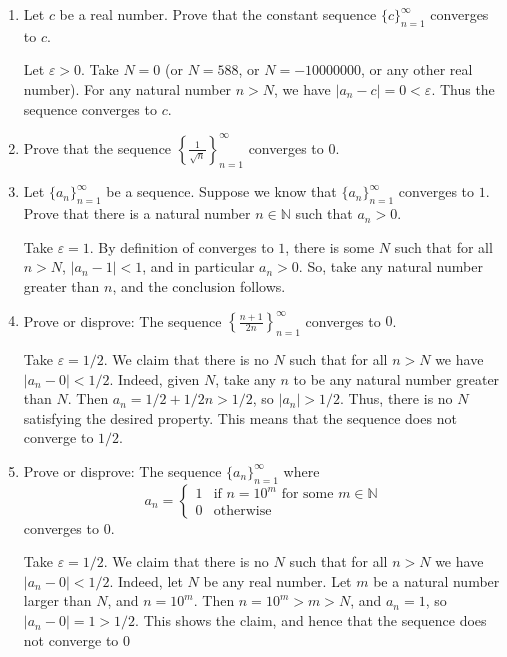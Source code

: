 \documentclass[12pt]{amsart}
\def\e{\varepsilon}
\newcommand{\N}{\mathbb{N}}
\numberwithin{equation}{section}
\theoremstyle{plain} %
\theoremstyle{definition}
\theoremstyle{remark}
\begin{document}
\begin{enumerate}
\item Let $c$ be a real number. Prove that the constant sequence $\{ c\}_{n=1}^\infty$ converges to $c$.

\begin{framed}
Let $\e>0$. Take $N=0$ (or $N=588$, or $N=-10000000$, or any other real number). For any natural number $n>N$, we have $|a_n - c| = 0 <\e$. Thus the sequence converges to $c$.
\end{framed}



\item Prove that the sequence $ \left\{ \frac{1}{\sqrt{n}} \right\}_{n=1}^\infty$ converges to $0$.





\item Let $\{a_n\}_{n=1}^\infty$ be a sequence. Suppose we know that $\{a_n\}_{n=1}^\infty$ converges to $1$. Prove that there is a natural number $n\in \N$ such that $a_n>0$.

\begin{framed}
Take $\e = 1$. By definition of converges to $1$, there is some $N$ such that for all $n>N$, $|a_n  - 1|< 1$, and in particular $a_n >0$. So, take any natural number greater than $n$, and the conclusion follows.
\end{framed}



\item Prove or disprove: The sequence $ \left\{\frac{n+1}{2n} \right\}_{n=1}^\infty$ converges to $0$.

\begin{framed}
Take $\e = 1/2$. We claim that there is no $N$ such that for all $n>N$ we have $|a_n - 0| < 1/2$. Indeed, given $N$, take any $n$ to be any natural number greater than $N$. Then $a_n = 1/2 + 1/2n > 1/2$, so $|a_n| > 1/2$. Thus, there is no $N$ satisfying the desired property. This means that the sequence does not converge to $1/2$.
\end{framed}



\item Prove or disprove: The sequence $\{a_n\}_{n=1}^\infty$ where
\[ a_n = \begin{cases} 1 &\text{if } n = 10^m \text{ for some } m\in \N \\
0 &\text{otherwise}\end{cases}
\]
converges to $0$. 

\begin{framed}
Take $\e = 1/2$. We claim that there is no $N$ such that for all $n>N$ we have $|a_n - 0| < 1/2$. Indeed, let $N$ be any real number. Let $m$ be a natural number larger than $N$, and $n=10^m$. Then $n = 10^m > m > N$, and $a_n = 1$, so $|a_n-0| = 1 > 1/2$. This shows the claim, and hence that the sequence does not converge to $0$
 \end{framed}


\end{enumerate}
\end{document}
